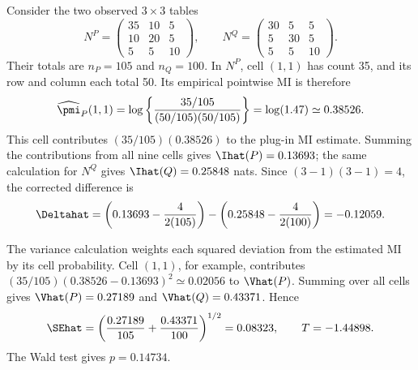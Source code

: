 Consider the two observed \(3\times3\) tables
\begin{equation}
  N^P=
  \begin{pmatrix}
  35&10&5\\
  10&20&5\\
  5&5&10
  \end{pmatrix},
  \qquad
  N^Q=
  \begin{pmatrix}
  30&5&5\\
  5&30&5\\
  5&5&10
  \end{pmatrix}.
  \label{eq:worked-tables}
\end{equation}
Their totals are \(n_P=105\) and \(n_Q=100\). In \(N^P\), cell
\((1,1)\) has count 35, and its row and column each total 50. Its empirical
pointwise MI is therefore
\begin{equation*}
 \widehat\pmi_P(1,1)
 =\log\left\{\frac{35/105}{(50/105)(50/105)}\right\}
 =\log(1.47)\simeq0.38526.
\end{equation*}
This cell contributes \((35/105)(0.38526)\) to the plug-in MI estimate.
Summing the contributions from all nine cells gives
\(\Ihat(P)=0.13693\); the same calculation for \(N^Q\) gives
\(\Ihat(Q)=0.25848\) nats. Since \((3-1)(3-1)=4\), the corrected difference is
\begin{equation}
  \Deltahat
  =\left(0.13693-\frac{4}{2(105)}\right)
  -\left(0.25848-\frac{4}{2(100)}\right)
  =-0.12059.
\end{equation}

The variance calculation weights each squared deviation from the estimated
MI by its cell probability. Cell \((1,1)\), for example, contributes
\((35/105)(0.38526-0.13693)^2\simeq0.02056\) to \(\Vhat(P)\).
Summing over all cells gives \(\Vhat(P)=0.27189\) and
\(\Vhat(Q)=0.43371\). Hence
\begin{equation}
  \SEhat
  =\left(\frac{0.27189}{105}+\frac{0.43371}{100}\right)^{1/2}
  =0.08323,
  \qquad
  T=-1.44898.
\end{equation}
The Wald test gives \(p=0.14734\).

